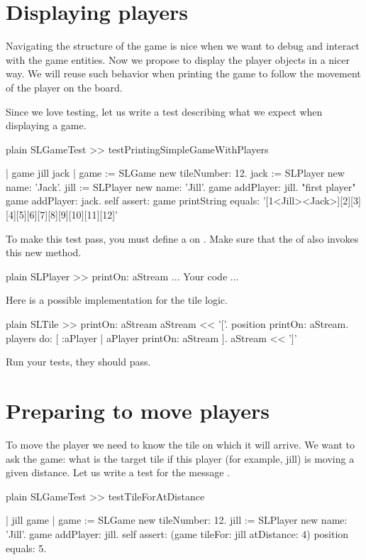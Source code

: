 \documentclass[10pt,twoside,english]{_support/latex/sbabook/sbabook}
\begin{document}
\section{Displaying players}
Navigating the structure of the game is nice when we want to debug and interact with the game entities. Now we propose to display the player objects in a nicer way. We will reuse such behavior when printing the game to follow the movement of the player on the board. 

Since we love testing, let us write a test describing what we expect when displaying a game. 

\begin{displaycode}{plain}
SLGameTest >> testPrintingSimpleGameWithPlayers

	| game jill jack |
	game := SLGame new tileNumber: 12.
	jack := SLPlayer new name: 'Jack'.
	jill := SLPlayer new name: 'Jill'.
	game addPlayer: jill. "first player" 
	game addPlayer: jack. 
	self 
		assert: game printString 
		equals: '[1<Jill><Jack>][2][3][4][5][6][7][8][9][10][11][12]'
\end{displaycode}

To make this test pass, you must define a  on . Make sure that the  of  also invokes this new method.

\begin{displaycode}{plain}
SLPlayer >> printOn: aStream
	... Your code ...
\end{displaycode}

Here is a possible implementation for the tile logic. 

\begin{displaycode}{plain}
SLTile >> printOn: aStream
	aStream << '['.
	position printOn: aStream.
	players do: [ :aPlayer | aPlayer printOn: aStream ].
	aStream << ']'
\end{displaycode}

Run your tests, they should pass.
\section{Preparing to move players}
To move the player we need to know the tile on which it will arrive.  We want to ask the game: what is the target tile if this player (for example, jill) is moving a given distance.
Let us write a test for the message .

\begin{displaycode}{plain}
SLGameTest >> testTileForAtDistance
	
	| jill game |
	game := SLGame new tileNumber: 12.
	jill := SLPlayer new name: 'Jill'.
	game addPlayer: jill. 
	self assert: (game tileFor: jill atDistance: 4) position equals: 5.
\end{displaycode}
\end{document}
